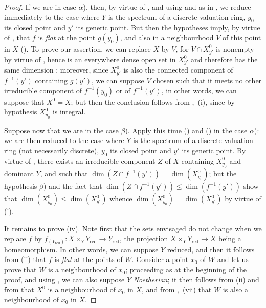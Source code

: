 \begin{proof}
If we are in case $\alpha$), then, by virtue of , and using  and  as in , we reduce immediately to the case where $Y$ is the spectrum of a discrete valuation ring, $y_0$ its closed point and $y'$ its generic point.
But then the hypotheses imply, by virtue of , that $f$ is \emph{flat} at the point $g(y_0)$, and also in a neighbourhood $V$ of this point in $X$ ().
To prove our assertion, we can replace $X$ by $V$, for $V\cap X_{y'}^0$ is nonempty by virtue of , hence is an everywhere dense open set in $X_{y'}^0$ and therefore has the same dimension ; moreover, since $X_{y'}^0$ is also the connected component of $f^{-1}(y')$ containing $g(y')$, we can suppose $V$ chosen such that it meets no other irreducible component of $f^{-1}(y_0)$ or of $f^{-1}(y')$, in other words, we can suppose that $X^0=X$; but then the conclusion follows from ,~(i), since by hypothesis $X_{y_0}^0$ is integral.

Suppose now that we are in the case $\beta$).
Apply this time () and () in the case $\alpha$): we are then reduced to the case where $Y$ is the spectrum of a discrete valuation ring (not necessarily discrete), $y_0$ its closed point and $y'$ its generic point.
By virtue of , there exists an irreducible component $Z$ of $X$ containing $X_{y_0}^0$ and dominant $Y$, and such that $\dim(Z\cap f^{-1}(y'))=\dim(X_{y_0}^0)$; but the hypothesis $\beta$) and the fact that $\dim(Z\cap f^{-1}(y'))\leq\dim(f^{-1}(y'))$ show that $\dim(X_{y_0}^0)\leq\dim(X_{y'}^0)$ whence $\dim(X_{y_0}^0)=\dim(X_{y'}^0)$ by virtue of (i).

It remains to prove (iv).
Note first that the sets envisaged do not change when we replace $f$ by $f_{(Y_\mathrm{red})}:X\times_Y Y_\mathrm{red}\to Y_\mathrm{red}$, the projection $X\times_Y Y_\mathrm{red}\to X$ being a homeomorphism.
In other words, we can suppose $Y$ reduced, and then it follows from (ii) that $f$ is \emph{flat} at the points of $W$.
Consider a point $x_0$ of $W$ and let us prove that $W$ is a neighbourhood of $x_0$; proceeding as at the beginning of the proof, and using , we can also suppose $Y$ \emph{Noetherian}; it then follows from (ii) and from  that $X^0$ is a neighbourhood of $x_0$ in $X$, and from ,~(vii) that $W$ is also a neighbourhood of $x_0$ in $X$.
\end{proof}

